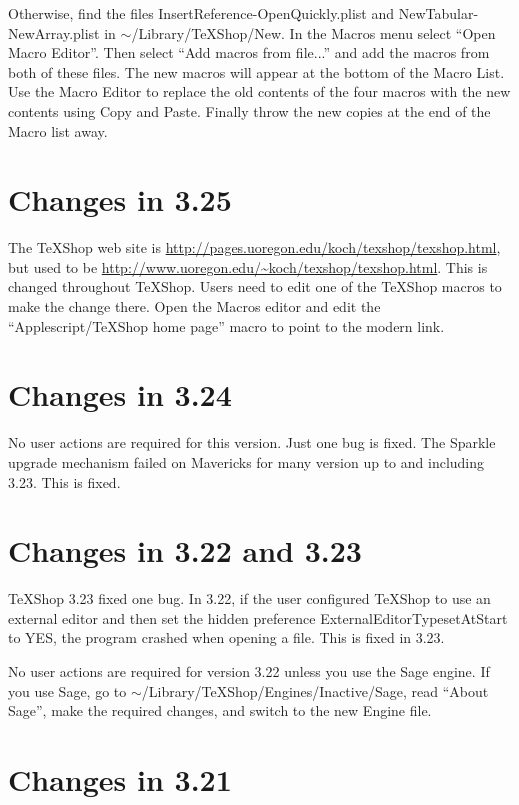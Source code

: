 \documentclass[11pt, oneside]{amsart}
\begin{document}
Otherwise, find the files InsertReference-OpenQuickly.plist and NewTabular-NewArray.plist
in $\sim$/Library/TeXShop/New. In the Macros menu select ``Open Macro Editor''. Then
select ``Add macros from file...'' and add the macros from both of these files. The
new macros will appear at the bottom of the Macro List. Use the Macro Editor to
replace the old contents of the four macros with the new contents using Copy and Paste.
Finally throw the new copies at the end of the Macro list away.

 
\section{Changes in 3.25} 

The TeXShop web site is \url{http://pages.uoregon.edu/koch/texshop/texshop.html}, but used to be \url{http://www.uoregon.edu/~koch/texshop/texshop.html}. This is changed throughout TeXShop. Users need to edit one of the TeXShop macros to make the change there. Open the Macros editor and edit the 
``Applescript/TeXShop home page'' macro to point to the modern link.
 
\section{Changes in 3.24}

No user actions are required for this version. Just one bug is fixed. The Sparkle
upgrade mechanism failed on Mavericks for many version up to and including 3.23. This
is fixed.

\section{Changes in 3.22 and 3.23}

TeXShop 3.23 fixed one bug. In 3.22, if the user configured TeXShop to use an external editor
and then set the hidden preference ExternalEditorTypesetAtStart to YES,  the program crashed when opening a file. This is fixed in 3.23.

No user actions are required for version 3.22 unless you use the Sage engine. If you use Sage, go to $\sim$/Library/TeXShop/Engines/Inactive/Sage, read ``About Sage'', make the required changes, and switch to the new Engine file.

\section{Changes in 3.21}
\end{document}
